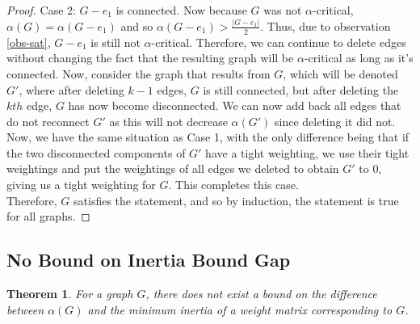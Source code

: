 \documentclass[12pt]{article}
\theoremstyle{parenbold}
\newtheorem{theorem}{Theorem}[section]
\begin{document}
\begin{proof}
Case 2: $G-e_1$ is connected. Now because $G$ was not $\alpha$-critical, $\alpha(G) = \alpha(G-e_1)$ and so $\alpha(G-e_1) > \frac{|G-e_1|}{2}$. Thus, due to observation \ref{obs-sat}, $G-e_1$ is still not $\alpha$-critical. Therefore, we can continue to delete edges without changing the fact that the resulting graph will be $\alpha$-critical as long as it's connected. Now, consider the graph that results from $G$, which will be denoted $G'$, where after deleting $k-1$ edges, $G$ is still connected, but after deleting the $kth$ edge, $G$ has now become disconnected. We can now add back all edges that do not reconnect $G'$ as this will not decrease $\alpha(G')$ since deleting it did not. Now, we have the same situation as Case 1, with the only difference being that if the two disconnected components of $G'$ have a tight weighting, we use their tight weightings and put the weightings of all edges we deleted to obtain $G'$ to 0, giving us a tight weighting for $G$. This completes this case. \\

Therefore, $G$ satisfies the statement, and so by induction, the statement is true for all graphs.
\end{proof}

\subsection{No Bound on Inertia Bound Gap}

\begin{theorem}
For a graph $G$, there does not exist a bound on the difference between $\alpha(G)$ and the minimum inertia of a weight matrix corresponding to $G$.
\end{theorem}
\end{document}
